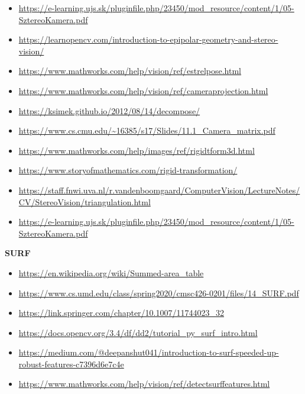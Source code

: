 \documentclass[12pt]{report}
\begin{document}
\begin{itemize}
            \item \url{https://e-learning.ujs.sk/pluginfile.php/23450/mod_resource/content/1/05-SztereoKamera.pdf}
            \item \url{https://learnopencv.com/introduction-to-epipolar-geometry-and-stereo-vision/}
            \item \url{https://www.mathworks.com/help/vision/ref/estrelpose.html}
            \item \url{https://www.mathworks.com/help/vision/ref/cameraprojection.html}
            \item \url{https://ksimek.github.io/2012/08/14/decompose/}
            \item \url{https://www.cs.cmu.edu/~16385/s17/Slides/11.1_Camera_matrix.pdf}
            \item \url{https://www.mathworks.com/help/images/ref/rigidtform3d.html}
            \item \url{https://www.storyofmathematics.com/rigid-transformation/}
            \item \url{https://staff.fnwi.uva.nl/r.vandenboomgaard/ComputerVision/LectureNotes/CV/StereoVision/triangulation.html}
            \item \url{https://e-learning.ujs.sk/pluginfile.php/23450/mod_resource/content/1/05-SztereoKamera.pdf}
        \end{itemize}
        \textbf{SURF}
        \begin{itemize}
            \item \url{https://en.wikipedia.org/wiki/Summed-area_table}
            \item \url{https://www.cs.umd.edu/class/spring2020/cmsc426-0201/files/14_SURF.pdf}
            \item \url{https://link.springer.com/chapter/10.1007/11744023_32}
            \item \url{https://docs.opencv.org/3.4/df/dd2/tutorial_py_surf_intro.html}
            \item \url{https://medium.com/@deepanshut041/introduction-to-surf-speeded-up-robust-features-c7396d6e7c4e}
            \item \url{https://www.mathworks.com/help/vision/ref/detectsurffeatures.html}
        \end{itemize}
\end{document}

